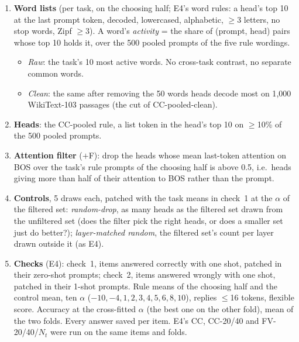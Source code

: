 \documentclass[10pt,a4paper]{article}
\begin{document}
\begin{enumerate}
\item \textbf{Word lists} (per task, on the choosing half; E4's word rules: a head's top 10 at the last prompt token, decoded, lowercased, alphabetic, $\geq$3 letters, no stop words, Zipf $\geq$3). A word's \emph{activity} = the share of (prompt, head) pairs whose top 10 holds it, over the 500 pooled prompts of the five rule wordings.
  \begin{itemize}
  \item \emph{Raw}: the task's 10 most active words. No cross-task contrast, no separate common words.
  \item \emph{Clean}: the same after removing the 50 words heads decode most on 1{,}000 WikiText-103 passages (the cut of CC-pooled-clean).
  \end{itemize}
\item \textbf{Heads}: the CC-pooled rule, a list token in the head's top 10 on $\geq$10\% of the 500 pooled prompts.
\item \textbf{Attention filter} ($+$F): drop the heads whose mean last-token attention on BOS over the task's rule prompts of the choosing half is above 0.5, i.e.\ heads giving more than half of their attention to BOS rather than the prompt.
\item \textbf{Controls}, 5 draws each, patched with the task means in check~1 at the $\alpha$ of the filtered set: \emph{random-drop}, as many heads as the filtered set drawn from the unfiltered set (does the filter pick the right heads, or does a smaller set just do better?); \emph{layer-matched random}, the filtered set's count per layer drawn outside it (as E4).
\item \textbf{Checks} (E4): check~1, items answered correctly with one shot, patched in their zero-shot prompts; check~2, items answered wrongly with one shot, patched in their 1-shot prompts. Rule means of the choosing half and the control mean, ten $\alpha$ ($-10, -4, 1, 2, 3, 4, 5, 6, 8, 10$), replies $\leq$16 tokens, flexible score. Accuracy at the cross-fitted $\alpha$ (the best one on the other fold), mean of the two folds. Every answer saved per item. E4's CC, CC-20/40 and FV-20/40/$N_t$ were run on the same items and folds.
\end{enumerate}
\end{document}
